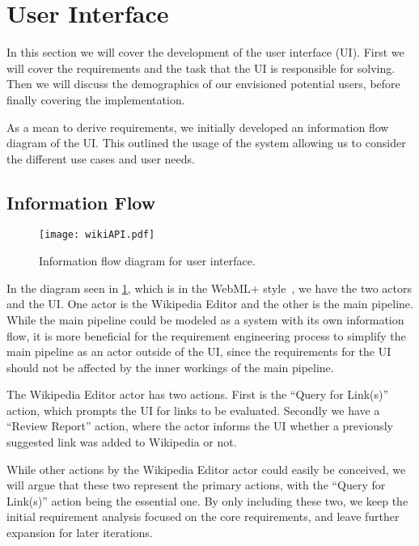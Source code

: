 \section{User Interface}\label{sec:design_ui}

In this section we will cover the development of the user interface (UI). First we will cover the requirements and the task that the UI is responsible for solving. Then we will discuss the demographics of our envisioned potential users, before finally covering the implementation. 

As a mean to derive requirements, we initially developed an information flow diagram of the UI. This outlined the usage of the system allowing us to consider the different use cases and user needs.

\subsection{Information Flow}

\begin{figure}[tbp]
\centering
\texttt{[image: wikiAPI.pdf]}
\caption{Information flow diagram for user interface.}\label{fig:information_flow_UI}
\end{figure}	

In the diagram seen in \cref{fig:information_flow_UI}, which is in the WebML+ style~\cite{Casteleyn2009}, we have the two actors and the UI\@. One actor is the Wikipedia Editor and the other is the main pipeline. While the main pipeline could be modeled as a system with its own information flow, it is more beneficial for the requirement engineering process to simplify the main pipeline as an actor outside of the UI, since the requirements for the UI should not be affected by the inner workings of the main pipeline.

The Wikipedia Editor actor has two actions. First is the \enquote{Query for Link(s)} action, which prompts the UI for links to be evaluated. Secondly we have a \enquote{Review Report} action, where the actor informs the UI whether a previously suggested link was added to Wikipedia or not.

While other actions by the Wikipedia Editor actor could easily be conceived, we will argue that these two represent the primary actions, with the \enquote{Query for Link(s)} action being the essential one. By only including these two, we keep the initial requirement analysis focused on the core requirements, and leave further expansion for later iterations.



